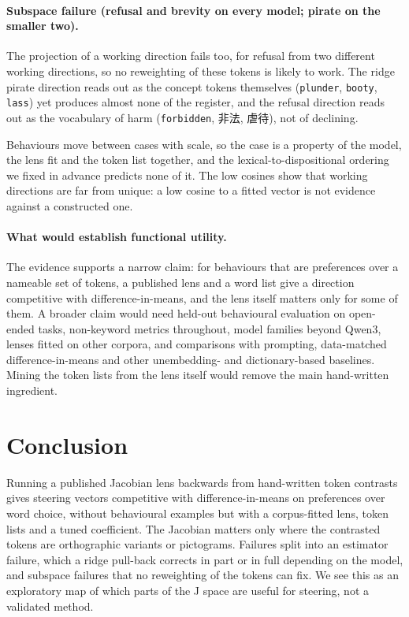 \documentclass{article}
\newcommand{\zh}[1]{{\zhfont #1}}
\begin{document}
\paragraph{Subspace failure (refusal and brevity on every model; pirate on the smaller two).} The projection of a working direction fails too, for refusal from two different working directions, so no reweighting of these tokens is likely to work. The ridge pirate direction reads out as the concept tokens themselves (\texttt{plunder}, \texttt{booty}, \texttt{lass}) yet produces almost none of the register, and the refusal direction reads out as the vocabulary of harm (\texttt{forbidden}, \zh{非法}, \zh{虐待}), not of declining.

Behaviours move between cases with scale, so the case is a property of the model, the lens fit and the token list together, and the lexical-to-dispositional ordering we fixed in advance predicts none of it. The low cosines show that working directions are far from unique: a low cosine to a fitted vector is not evidence against a constructed one.

\paragraph{What would establish functional utility.} The evidence supports a narrow claim: for behaviours that are preferences over a nameable set of tokens, a published lens and a word list give a direction competitive with difference-in-means, and the lens itself matters only for some of them. A broader claim would need held-out behavioural evaluation on open-ended tasks, non-keyword metrics throughout, model families beyond Qwen3, lenses fitted on other corpora, and comparisons with prompting, data-matched difference-in-means and other unembedding- and dictionary-based baselines. Mining the token lists from the lens itself would remove the main hand-written ingredient.

\section{Conclusion}

Running a published Jacobian lens backwards from hand-written token contrasts gives steering vectors competitive with difference-in-means on preferences over word choice, without behavioural examples but with a corpus-fitted lens, token lists and a tuned coefficient. The Jacobian matters only where the contrasted tokens are orthographic variants or pictograms. Failures split into an estimator failure, which a ridge pull-back corrects in part or in full depending on the model, and subspace failures that no reweighting of the tokens can fix. We see this as an exploratory map of which parts of the J space are useful for steering, not a validated method.
\end{document}
